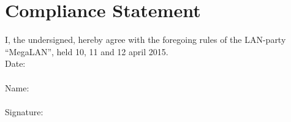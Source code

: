 \documentclass{article}
\begin{document}
\section{Compliance Statement}
I, the undersigned, hereby agree with the foregoing rules of the LAN-party 
``MegaLAN'', held 10, 11 and 12 april 2015.
\\
Date:\\
\\
Name:\\
\\
Signature:\\
\end{document}
